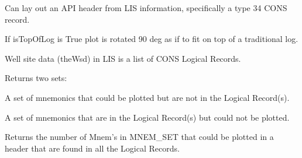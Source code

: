 \documentclass[letterpaper,10pt,english]{sphinxmanual}
\begin{document}

\begin{fulllineitems}
\label{\detokenize{ref/util/plot/LogHeader:TotalDepth.util.plot.LogHeader.APIHeaderLIS}}
Can lay out an API header from LIS information, specifically a type 34 CONS record.

If isTopOfLog is True plot is rotated 90 deg as if to fit on top of a traditional log.

\begin{fulllineitems}
\label{\detokenize{ref/util/plot/LogHeader:TotalDepth.util.plot.LogHeader.APIHeaderLIS.missingFields}}
Well site data (theWsd) in LIS is a list of CONS Logical Records.

Returns two sets:

A set of mnemonics that could be plotted but are not in the Logical Record(s).

A set of mnemonics that are in the Logical Record(s) but could not be plotted.

\end{fulllineitems}


\begin{fulllineitems}
\label{\detokenize{ref/util/plot/LogHeader:TotalDepth.util.plot.LogHeader.APIHeaderLIS.lrDataCount}}
Returns the number of Mnem’s in MNEM\_SET that could be plotted in a
header that are found in all the Logical Records.

\end{fulllineitems}


\end{fulllineitems}

\end{document}
